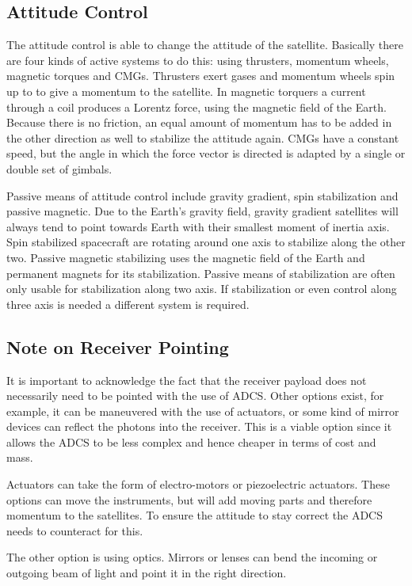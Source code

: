 \subsection{Attitude Control}
The attitude control is able to change the attitude of the satellite. Basically there are four kinds of active systems to do this: using thrusters, momentum wheels, magnetic torques and \acp{CMG}. Thrusters exert gases and momentum wheels spin up to to give a momentum to the satellite. In magnetic torquers a current through a coil produces a Lorentz force, using the magnetic field of the Earth. Because there is no friction, an equal amount of momentum has to be added in the other direction as well to stabilize the attitude again. \ac{CMG}s have a constant speed, but the angle in which the force vector is directed is adapted by a single or double set of gimbals. 

Passive means of attitude control include gravity gradient, spin stabilization and passive magnetic. Due to the Earth's gravity field, gravity gradient satellites will always tend to point towards Earth with their smallest moment of inertia axis. Spin stabilized spacecraft are rotating around one axis to stabilize along the other two. Passive magnetic stabilizing uses the magnetic field of the Earth and permanent magnets for its stabilization. Passive means of stabilization are often only usable for stabilization along two axis. If stabilization or even control along three axis is needed a different system is required.

\subsection{Note on Receiver Pointing}
It is important to acknowledge the fact that the receiver payload does not necessarily need to be pointed with the use of \ac{ADCS}. Other options exist, for example, it can be maneuvered with the use of actuators, or some kind of mirror devices can reflect the photons into the receiver. This is a viable option since it allows the \ac{ADCS} to be less complex and hence cheaper in terms of cost and mass.

Actuators can take the form of electro-motors or piezoelectric actuators. These options can move the instruments, but will add moving parts and therefore momentum to the satellites. To ensure the attitude to stay correct the \ac{ADCS} needs to counteract for this.

The other option is using optics. Mirrors or lenses can bend the incoming or outgoing beam of light and point it in the right direction.

